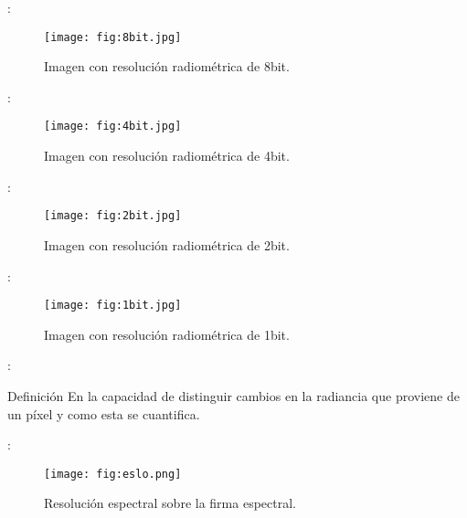 \begin{frame}{\secname : \subsecname}
  \begin{figure}
    \centering
    \texttt{[image: fig:8bit.jpg]}
    \caption{Imagen con resolución radiométrica de 8bit.}
    \label{}
  \end{figure}
\end{frame}

\begin{frame}{\secname : \subsecname}
  \begin{figure}
    \centering
    \texttt{[image: fig:4bit.jpg]}
    \caption{Imagen con resolución radiométrica de 4bit.}
    \label{}
  \end{figure}
\end{frame}

\begin{frame}{\secname : \subsecname}
  \begin{figure}
    \centering
    \texttt{[image: fig:2bit.jpg]}
    \caption{Imagen con resolución radiométrica de 2bit.}
    \label{}
  \end{figure}
\end{frame}

\begin{frame}{\secname : \subsecname}
  \begin{figure}
    \centering
    \texttt{[image: fig:1bit.jpg]}
    \caption{Imagen con resolución radiométrica de 1bit.}
    \label{}
  \end{figure}
\end{frame}

\begin{frame}{\secname : \subsecname}
    \begin{block}{Definición}
        En la capacidad de distinguir cambios en la radiancia que proviene de un píxel y como esta se cuantifica.
    \end{block}
\end{frame}

\begin{frame}{\secname : \subsecname}
  \begin{figure}
    \centering
    \texttt{[image: fig:eslo.png]}
    \caption{Resolución espectral sobre la firma espectral.}
    \label{}
  \end{figure}
\end{frame}

